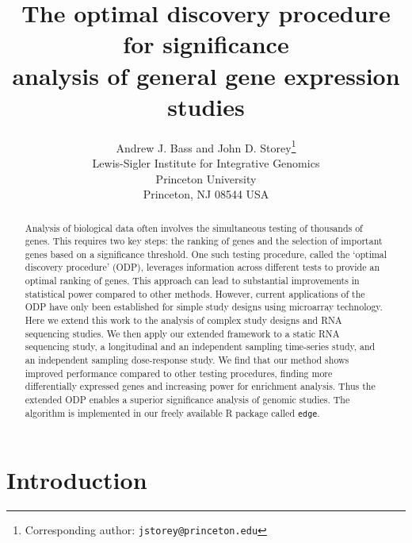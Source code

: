 \documentclass[11pt]{article}
\begin{document}
\clearpage

\title{\LARGE \bf The optimal discovery procedure for significance\\analysis of general gene expression studies} 
\author{{\Large Andrew J. Bass and John D. Storey\thanks{Corresponding author: \texttt{jstorey@princeton.edu}}} \\ Lewis-Sigler Institute for Integrative Genomics \\ Princeton University \\ Princeton, NJ 08544 USA}
\maketitle

\begin{abstract} 
Analysis of biological data often involves the simultaneous testing of thousands of genes. This requires two key steps: the ranking of genes and the selection of important genes based on a significance threshold. One such testing procedure, called the `optimal discovery procedure' (ODP), leverages information across different tests to provide an optimal ranking of genes. This approach can lead to substantial improvements in statistical power compared to other methods. However, current applications of the ODP have only been established for simple study designs using microarray technology. Here we extend this work to the analysis of complex study designs and RNA sequencing studies. We then apply our extended framework to a static RNA sequencing study, a longitudinal and an independent sampling time-series study, and an independent sampling dose-response study. We find that our method shows improved performance compared to other testing procedures, finding more differentially expressed genes and increasing power for enrichment analysis. Thus the extended ODP enables a superior significance analysis of genomic studies. The algorithm is implemented in our freely available R package called \texttt{edge}.
\end{abstract}

\clearpage
\tableofcontents

\clearpage

\section{Introduction \label{Sec:intro}}
\end{document}
